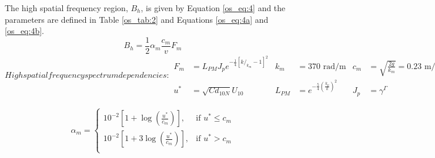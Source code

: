 The high spatial frequency region, $B_h$, is given by Equation \ref{os_eq:4} and the parameters are defined in Table \ref{os_tab:2} and Equations \ref{os_eq:4a} and \ref{os_eq:4b}.
\begin{equation}
  \label{os_eq:4}
 B_h = \frac{1}{2} \alpha_m \frac{c_m}{v} F_m
\end{equation}
\renewcommand{\baselinestretch}{2} \small\normalsize
\begin{subequations}
\label{os_eq:4a}
   High spatial frequency spectrum dependencies:
\begin{align}
  F_m &= L_{PM}J_pe^{-\frac{1}{4}\left[k/_{k_m} - 1 \right]^2 } & k_m & = 370 \text{ rad/m} &  c_m &=\sqrt{\frac{2g}{k_m}} = 0.23 \text{ m/s} \\
  u^* &= \sqrt{Cd_{10N}}U_{10}  & L_{PM} &=e^{-\frac{5}{4}\left(\frac{k_p}{k} \right)^2}  &  J_p &= \gamma^\Gamma
\end{align}
\end{subequations}
\renewcommand{\baselinestretch}{2} \small\normalsize

\begin{equation}
\begin{gathered}
  \label{os_eq:4b}
   \alpha_m= \begin{cases}
    10^{-2}\left[1 + \log\left(\frac{u^*}{c_m} \right) \right],& \text{if } u^* \leq c_m\\
    10^{-2}\left[1 + 3\log\left(\frac{u^*}{c_m} \right) \right], & \text{if } u^* > c_m\\
  \end{cases}
\end{gathered}
\end{equation}
\renewcommand{\baselinestretch}{2} \small\normalsize

